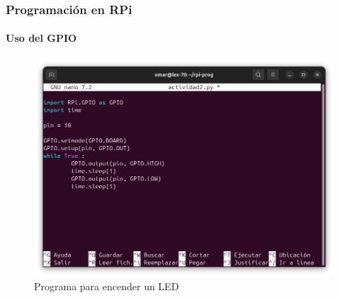 \documentclass{beamer}
\begin{document}
	\begin{frame}
		\frametitle{Programación en RPi}
		\framesubtitle{Uso del GPIO}
		\begin{figure}
			\includegraphics[scale=0.3]{led.png}
			\caption{Programa para encender un LED}
		\end{figure}
	\end{frame}
\end{document}
